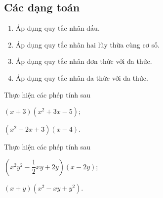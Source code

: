 \subsection{Các dạng toán}
\begin{dang}
	\begin{enumerate}[\tickEX]
		\item Áp dụng quy tắc nhân dấu.
		\item Áp dụng quy tắc nhân hai lũy thừa cùng cơ số.
		\item Áp dụng quy tắc nhân đơn thức với đa thức.
		\item Áp dụng quy tắc nhân đa thức với đa thức.
	\end{enumerate}
\end{dang}
\begin{vd}
	Thực hiện các phép tính sau
	\begin{listEX}[2]
		\item $\left(x+3\right)\left(x^2+3x-5\right)$;
		\item $\left(x^2-2x+3\right)\left(x-4\right)$.
	\end{listEX}
\end{vd}
\begin{vd}
	Thực hiện các phép tính sau
	\begin{listEX}[2]
		\item $\left(x^2y^2-\dfrac{1}{2}xy+2y\right)(x-2y)$;
		\item $(x+y)(x^2-xy+y^2)$.
	\end{listEX}
\end{vd}
